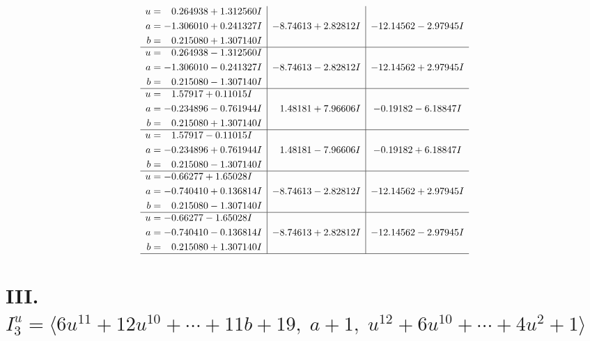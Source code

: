 \documentclass[1p]{elsarticle_modified}
\theoremstyle{definition}
\begin{document}
$$\begin{array}{c|c|c}
\begin{aligned}
u &= \phantom{-}0.264938 + 1.312560 I \\
a &= -1.306010 + 0.241327 I \\
b &= \phantom{-}0.215080 + 1.307140 I\end{aligned}
 & -8.74613 + 2.82812 I & -12.14562 - 2.97945 I \\ \hline\begin{aligned}
u &= \phantom{-}0.264938 - 1.312560 I \\
a &= -1.306010 - 0.241327 I \\
b &= \phantom{-}0.215080 - 1.307140 I\end{aligned}
 & -8.74613 - 2.82812 I & -12.14562 + 2.97945 I \\ \hline\begin{aligned}
u &= \phantom{-}1.57917 + 0.11015 I \\
a &= -0.234896 - 0.761944 I \\
b &= \phantom{-}0.215080 + 1.307140 I\end{aligned}
 & \phantom{-}1.48181 + 7.96606 I & -0.19182 - 6.18847 I \\ \hline\begin{aligned}
u &= \phantom{-}1.57917 - 0.11015 I \\
a &= -0.234896 + 0.761944 I \\
b &= \phantom{-}0.215080 - 1.307140 I\end{aligned}
 & \phantom{-}1.48181 - 7.96606 I & -0.19182 + 6.18847 I \\ \hline\begin{aligned}
u &= -0.66277 + 1.65028 I \\
a &= -0.740410 + 0.136814 I \\
b &= \phantom{-}0.215080 - 1.307140 I\end{aligned}
 & -8.74613 - 2.82812 I & -12.14562 + 2.97945 I \\ \hline\begin{aligned}
u &= -0.66277 - 1.65028 I \\
a &= -0.740410 - 0.136814 I \\
b &= \phantom{-}0.215080 + 1.307140 I\end{aligned}
 & -8.74613 + 2.82812 I & -12.14562 - 2.97945 I\\
 \hline 
 \end{array}$$\newpage\newpage\renewcommand{\arraystretch}{1}
\centering \section*{III. $I^u_{3}= \langle 6 u^{11}+12 u^{10}+\cdots+11 b+19,\;a+1,\;u^{12}+6 u^{10}+\cdots+4 u^2+1 \rangle$}
\end{document}
